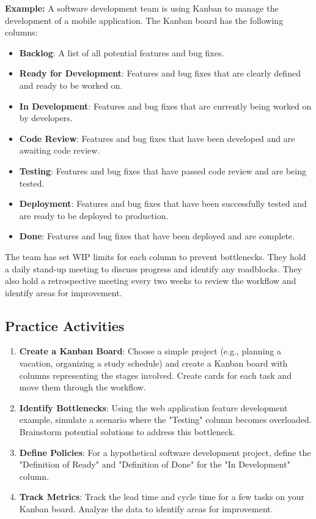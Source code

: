 \textbf{Example:} A software development team is using Kanban to manage the development of a mobile application. The Kanban board has the following columns:

\begin{itemize}
  \item \textbf{Backlog}: A list of all potential features and bug fixes.
  \item \textbf{Ready for Development}: Features and bug fixes that are clearly defined and ready to be worked on.
  \item \textbf{In Development}: Features and bug fixes that are currently being worked on by developers.
  \item \textbf{Code Review}: Features and bug fixes that have been developed and are awaiting code review.
  \item \textbf{Testing}: Features and bug fixes that have passed code review and are being tested.
  \item \textbf{Deployment}: Features and bug fixes that have been successfully tested and are ready to be deployed to production.
  \item \textbf{Done}: Features and bug fixes that have been deployed and are complete.
\end{itemize}

The team has set WIP limits for each column to prevent bottlenecks. They hold a
daily stand-up meeting to discuss progress and identify any roadblocks. They
also hold a retrospective meeting every two weeks to review the workflow and
identify areas for improvement.

\subsection{Practice Activities}

\begin{enumerate}
  \item \textbf{Create a Kanban Board}: Choose a simple project (e.g., planning a vacation, organizing a study schedule) and create a Kanban board with columns representing the stages involved. Create cards for each task and move them through the workflow.
  \item \textbf{Identify Bottlenecks}: Using the web application feature development example, simulate a scenario where the "Testing" column becomes overloaded. Brainstorm potential solutions to address this bottleneck.
  \item \textbf{Define Policies}: For a hypothetical software development project, define the "Definition of Ready" and "Definition of Done" for the "In Development" column.
  \item \textbf{Track Metrics}: Track the lead time and cycle time for a few tasks on your Kanban board. Analyze the data to identify areas for improvement.
\end{enumerate}

